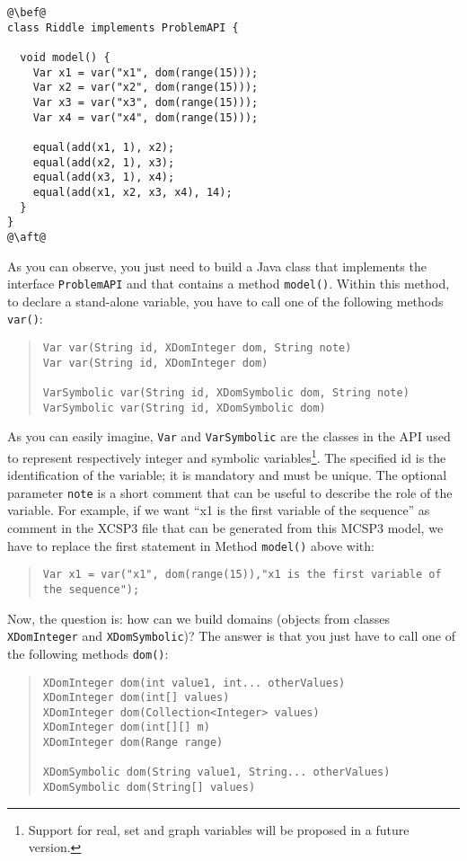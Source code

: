 \documentclass[10pt]{article}
\def\xt{{\rm XCSP3}\xspace}
\newcommand{\nn}[1]{{\tt #1}} %
\def\mt{{\rm MCSP3}\xspace}
\def\xt{{\rm XCSP3}\xspace}
\begin{document}
\begin{lstlisting}
@\bef@
class Riddle implements ProblemAPI {

  void model() {
    Var x1 = var("x1", dom(range(15)));
    Var x2 = var("x2", dom(range(15)));
    Var x3 = var("x3", dom(range(15)));
    Var x4 = var("x4", dom(range(15)));
    
    equal(add(x1, 1), x2);
    equal(add(x2, 1), x3);
    equal(add(x3, 1), x4);
    equal(add(x1, x2, x3, x4), 14);
  }
}
@\aft@
\end{lstlisting}

As you can observe, you just need to build a Java class that implements the interface \nn{ProblemAPI} and that contains a method \nn{model()}.
Within this method, to declare a stand-alone variable, you have to call one of the following methods \nn{var()}: 

\begin{quote}
\begin{verbatim}
Var var(String id, XDomInteger dom, String note)
Var var(String id, XDomInteger dom) 

VarSymbolic var(String id, XDomSymbolic dom, String note)
VarSymbolic var(String id, XDomSymbolic dom) 
\end{verbatim}
\end{quote}

As you can easily imagine, \nn{Var} and \nn{VarSymbolic} are the classes in the API used to represent respectively integer and symbolic variables\footnote{Support for real, set and graph variables will be proposed in a future version.}.
The specified id is the identification of the variable; it is mandatory and must be unique.
The optional parameter \nn{note} is a short comment that can be useful to describe the role of the variable.
For example, if we want ``x1 is the first variable of the sequence'' as comment in the \xt file that can be generated from this \mt model, we have to replace the first statement in Method \nn{model()} above with:

\begin{quote}
\begin{verbatim}
Var x1 = var("x1", dom(range(15)),"x1 is the first variable of the sequence");
\end{verbatim}
\end{quote}

Now, the question is: how can we build domains (objects from classes \nn{XDomInteger} and \nn{XDomSymbolic})?
The answer is that you just have to call one of the following methods \nn{dom()}: 
\begin{quote}
\begin{verbatim}
XDomInteger dom(int value1, int... otherValues) 
XDomInteger dom(int[] values) 
XDomInteger dom(Collection<Integer> values) 
XDomInteger dom(int[][] m) 
XDomInteger dom(Range range) 

XDomSymbolic dom(String value1, String... otherValues) 
XDomSymbolic dom(String[] values)
\end{verbatim}
\end{quote}
\end{document}
